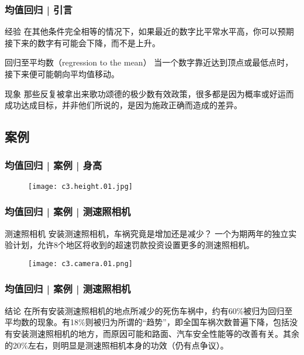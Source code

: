\begin{frame}
  \frametitle{均值回归 | 引言}
  \begin{block}{经验}
    在其他条件完全相等的情况下，如果最近的数字比平常水平高，你可以预期接下来的数字有可能会下降，而不是上升。
  \end{block}
  \pause
  \begin{block}{回归至平均数（regression to the mean）}
    当一个数字靠近达到顶点或最低点时，接下来便可能朝向平均值移动。
  \end{block}
  \pause
  \begin{block}{现象}
    那些反复被拿出来歌功颂德的极少数有效政策，很多都是因为概率或好运而成功达成目标，并非他们所说的，是因为施政正确而造成的差异。
  \end{block}
\end{frame}

\subsection{案例}
\begin{frame}
  \frametitle{均值回归 | 案例 | 身高}
  \begin{figure}
    \centering
    \texttt{[image: c3.height.01.jpg]}
  \end{figure}
\end{frame}

\begin{frame}
  \frametitle{均值回归 | 案例 | 测速照相机}
  \begin{block}{测速照相机}
    安装测速照相机，车祸究竟是增加还是减少？
    一个为期两年的独立实验计划，允许8个地区将收到的超速罚款投资设置更多的测速照相机。
  \end{block}
  \begin{figure}
    \centering
    \texttt{[image: c3.camera.01.png]}
  \end{figure}
\end{frame}

\begin{frame}
  \frametitle{均值回归 | 案例 | 测速照相机}
  \begin{block}{结论}
    在所有安装测速照相机的地点所减少的死伤车祸中，约有60\%被归为回归至平均数的现象。有18\%则被归为所谓的“趋势”，即全国车祸次数普遍下降，包括没有安装测速照相机的地方，而原因可能和路面、汽车安全性能等的改善有关。其余的20\%左右，则明显是测速照相机本身的功效（仍有点争议）。
  \end{block}
\end{frame}

